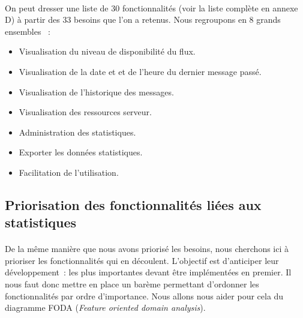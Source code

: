 			\paragraph{}%
			On peut dresser une liste de 30 fonctionnalités (voir la liste
			complète en annexe D) à partir des 33 besoins que l'on a retenus. Nous
			regroupons en 8 grands ensembles \label{ensembles_fonctios}~:
			\begin{itemize}
			  \item Visualisation du niveau de disponibilité du flux.
			  \item Visualisation de la date et et de l'heure du dernier message passé.
			  \item Visualisation de l’historique des messages.
			  \item Visualisation des ressources serveur.
			  \item Administration des statistiques.
			  \item Exporter les données statistiques.
			  \item Facilitation de l’utilisation.
			\end{itemize}
			
		\subsection{Priorisation des fonctionnalités liées aux statistiques}
			\paragraph{}%
			De la même manière que nous avons priorisé les besoins, nous cherchons ici à
			prioriser les fonctionnalités qui en découlent. L'objectif est
			d'anticiper leur développement~: les plus importantes
			devant être implémentées en premier. Il nous faut donc mettre en place un
			barème permettant d'ordonner les fonctionnalités par ordre d'importance. Nous
			allons nous aider pour cela du diagramme FODA (\textit{Feature oriented
			domain analysis}).
			
